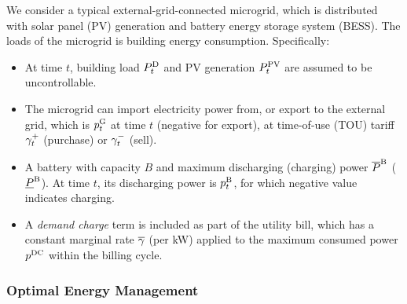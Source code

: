 We consider a typical external-grid-connected microgrid, which is distributed with solar panel (PV) generation and battery energy storage system (BESS). The loads of the microgrid is building energy consumption. Specifically:

\begin{itemize}
    \item At time $t$, building load $P^\text{D}_t$ and PV generation $P^\text{PV}_t$ are assumed to be uncontrollable.
    \item The microgrid can import electricity power from, or export to the external grid, which is $p^{\text{G}}_t$ at time $t$ (negative for export), at time-of-use (TOU) tariff $\gamma^+_t$ (purchase) or $\gamma^-_t$ (sell).
    \item A battery with capacity $B$ and maximum discharging (charging) power $\overline{P}^\text{B}$ ($\underline{P}^\text{B}$). At time $t$, its discharging power is $p^\text{B}_t$, for which negative value indicates charging.
    \item A \emph{demand charge} term is included as part of the utility bill, which has a constant marginal rate $\overline{\gamma}$ (per kW) applied to the maximum consumed power $p^\text{DC}$ within the billing cycle.%
\end{itemize}

\subsubsection{Optimal Energy Management} %

